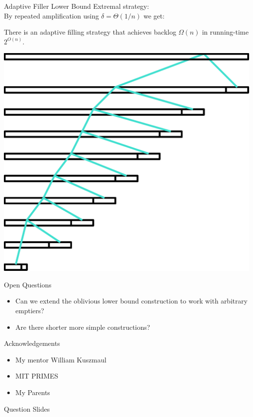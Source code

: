 \documentclass[xcolor=x11names, svgnames, rgb]{beamer}
\begin{document}
\begin{frame}[t]{Adaptive Filler Lower Bound}
  Extremal strategy:\\
  By repeated amplification using $\delta=\Theta(1/n)$ we get: 
  \begin{theorem}
    There is an adaptive filling strategy that achieves backlog $\Omega(n)$ in running-time $2^{O(n)}$.
  \end{theorem}
  \vspace{0.5cm}
  \includegraphics[width=0.45\linewidth]{amplificationImgs/expo_cor.eps}
\end{frame}

\begin{frame}[t]{Open Questions}
  \begin{itemize}
    \item Can we extend the oblivious lower bound construction to work with arbitrary emptiers?
    \item Are there shorter more simple constructions?
  \end{itemize}
\end{frame}

\begin{frame}[t]{Acknowledgements}
  \begin{itemize}
    \item My mentor William Kuszmaul
    \item MIT PRIMES
    \item My Parents
 \end{itemize} 
\end{frame}

\begin{frame}[c]{}
\begin{center}
\Huge Question Slides
\end{center}
\end{frame}
\end{document}
